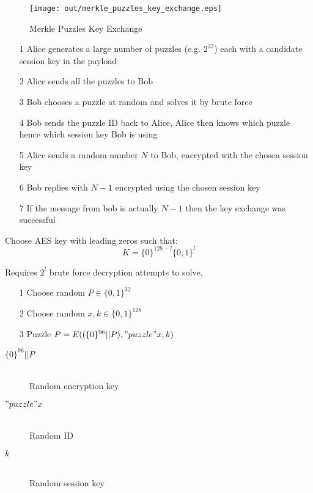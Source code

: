 \documentclass[a4paper]{article}
\begin{document}
\begin{figure}[h!]
  \centering
  \texttt{[image: out/merkle\_puzzles\_key\_exchange.eps]}
  \caption{Merkle Puzzles Key Exchange}
  \label{fig:merkle_puzzles_key_exchange}
\end{figure}
\FloatBarrier


\begin{enumerate}
  \item[1] Alice generates a large number of puzzles (e.g. $2^{32}$) each with a
           candidate session key in the payload
  \item[2] Alice sends all the puzzles to Bob
  \item[3] Bob chooses a puzzle at random and solves it by brute force
  \item[4] Bob sends the puzzle ID back to Alice, Alice then knows which puzzle
           hence which session key Bob is using
  \item[5] Alice sends a random number $N$ to Bob, encrypted with the
           chosen session key
  \item[6] Bob replies with $N-1$ encrypted using the chosen session key
  \item[7] If the message from bob is actually $N-1$ then the key exchange was
           successful
\end{enumerate}

Choose AES key with leading zeros such that:
\[K = \{0\}^{128-l} \{0,1\}^{l}\]

Requires $2^{l}$ brute force decryption attempts to solve.


\begin{enumerate}
  \item[1] Choose random $P \in \{0,1\}^{32}$
  \item[2] Choose random $x, k \in \{0,1\}^{128}$
  \item[3] Puzzle $P = E((\{0\}^{96}||P), "puzzle" x, k)$
\end{enumerate}


\begin{description}
  \item[$\{0\}^{96} || P$] \hfill \\
    Random encryption key
  \item[$"puzzle" x$] \hfill \\
    Random ID
  \item[$k$] \hfill \\
    Random session key
\end{description}
\end{document}
